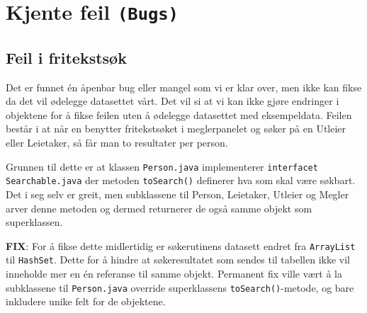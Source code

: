\section{Kjente feil \texttt{(Bugs)}}
\subsection{Feil i fritekstsøk}
Det er funnet én åpenbar bug eller mangel som vi er klar over, men ikke kan fikse da det vil ødelegge datasettet vårt. Det vil si at vi kan ikke gjøre endringer i objektene for å fikse feilen uten å ødelegge datasettet med eksempeldata. 
Feilen består i at når en benytter fritekstsøket i meglerpanelet og søker på en Utleier eller Leietaker, så får man to resultater per person. 

Grunnen til dette er at klassen \texttt{Person.java} implementerer \texttt{interfacet Searchable.java} der metoden \texttt{toSearch()} definerer hva som skal være søkbart.
Det i seg selv er greit, men subklassene til Person, Leietaker, Utleier og Megler arver denne metoden og dermed returnerer de også samme objekt som superklassen. 

\textbf{FIX}: For å fikse dette midlertidig er søkerutinens datasett endret fra \texttt{ArrayList} til \texttt{HashSet}. Dette for å hindre at søkeresultatet som sendes til tabellen ikke vil inneholde mer en én referanse til samme objekt.
Permanent fix ville vært å la subklassene til \texttt{Person.java} override superklassens \texttt{toSearch()}-metode, og bare inkludere unike felt for de objektene.
